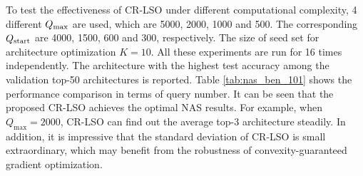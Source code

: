 \documentclass[10pt,twocolumn,letterpaper]{article}
\begin{document}
To test the effectiveness of CR-LSO under different computational complexity, 4 different $Q_{\rm max}$ are used, which are 5000, 2000, 1000 and 500. The corresponding $Q_{\rm start}$ are 4000, 1500, 600 and 300, respectively. The size of seed set for architecture optimization $K=10$. All these experiments are run for 16 times independently. The architecture with the highest test accuracy among the validation top-50 architectures is reported. Table \ref{tab:nas_ben_101} shows the performance comparison in terms of query number. It can be seen that the proposed CR-LSO achieves the optimal NAS results. For example, when $Q_{\max} = 2000$, CR-LSO can find out the average top-3 architecture steadily. In addition, it is impressive that the standard deviation of CR-LSO is small extraordinary, which may benefit from the robustness of convexity-guaranteed gradient optimization.
\end{document}
